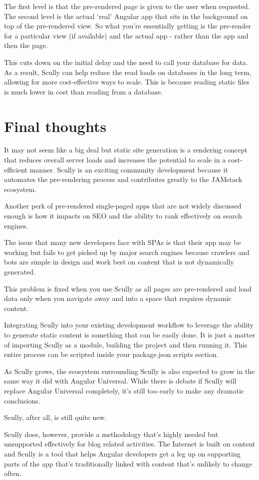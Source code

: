 The first level is that the pre-rendered page is given to the user when requested. The second level is the actual ‘real’ Angular app that sits in the background on top of the pre-rendered view. So what you’re essentially getting is the pre-render for a particular view (if available) and the actual app - rather than the app and then the page.

This cuts down on the initial delay and the need to call your database for data. As a result, Scully can help reduce the read loads on databases in the long term, allowing for more cost-effective ways to scale. This is because reading static files is much lower in cost than reading from a database.  

\section{Final thoughts}
It may not seem like a big deal but static site generation is a rendering concept that reduces overall server loads and increases the potential to scale in a cost-efficient manner. Scully is an exciting community development because it automates the pre-rendering process and contributes greatly to the JAMstack ecosystem. 

Another perk of pre-rendered single-paged apps that are not widely discussed enough is how it impacts on SEO and the ability to rank effectively on search engines. 

The issue that many new developers face with SPAs is that their app may be working but fails to get picked up by major search engines because crawlers and bots are simple in design and work best on content that is not dynamically generated.

This problem is fixed when you use Scully as all pages are pre-rendered and load data only when you navigate away and into a space that requires dynamic content. 

Integrating Scully into your existing development workflow to leverage the ability to generate static content is something that can be easily done. It is just a matter of importing Scully as a module, building the project and then running it. This entire process can be scripted inside your package.json scripts section. 

As Scully grows, the ecosystem surrounding Scully is also expected to grow in the same way it did with Angular Universal. While there is debate if Scully will replace Angular Universal completely, it’s still too early to make any dramatic conclusions.

Scully, after all, is still quite new. 

Scully does, however, provide a methodology that’s highly needed but unsupported effectively for blog related activities. The Internet is built on content and Scully is a tool that helps Angular developers get a leg up on supporting parts of the app that’s traditionally linked with content that’s unlikely to change often. 








